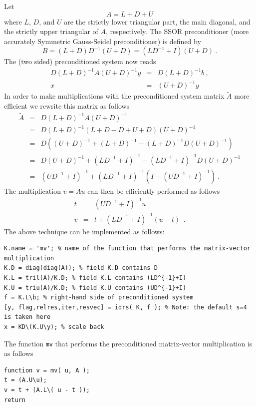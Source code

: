 \documentclass[prodmode,acmtoms]{acmsmall}
\begin{document}
Let 
\[
   A = L + D + U\nonumber
\]
where $L$, $D$, and $U$ are the strictly lower triangular part, the main diagonal, and the strictly upper triangular of $A$, respectively. 
The SSOR preconditioner (more accurately Symmetric Gauss-Seidel preconditioner) is defined by
\[
  B = (L+D) D^{-1} (U + D) = (L D^{-1} +I)(U + D) ~.
\]
The (two sided) preconditioned system now reads
\begin{eqnarray}\nonumber
  D (L+D)^{-1} A (U + D)^{-1} y &=&  D (L+D)^{-1}b ~,\\
  x &=& (U + D)^{-1} y
\end{eqnarray}
In order to make multiplications with the preconditioned system matrix $\tilde{A}$ more
efficient we rewrite this matrix as follows
\begin{eqnarray}\nonumber
  \tilde{A} &=& D (L+D)^{-1} A (U+D)^{-1}\\ \nonumber
            &=& D (L+D)^{-1} (L+D -D +U+D) (U+D)^{-1}\\  \nonumber
            &=& D ((U+D)^{-1} + (L+D)^{-1} - (L+D)^{-1}D(U+D)^{-1} )\\ \nonumber 
            &=& D(U+D)^{-1} + (LD^{-1}+I)^{-1} - (LD^{-1}+I)^{-1}D(U+D)^{-1}\\ \nonumber 
            &=& (UD^{-1}+I)^{-1} + (LD^{-1}+I)^{-1}(I - (UD^{-1}+I)^{-1} ) \nonumber ~.
\end{eqnarray}
The multiplication $v = \tilde{A}u$ can then be efficiently performed as follows
\begin{eqnarray}\nonumber
   t &=& (UD^{-1}+I)^{-1}u\\ \nonumber
   v &=& t + (LD^{-1}+I)^{-1}( u - t ) \nonumber ~~.
\end{eqnarray}
The above technique can be implemented as follows:
\begin{verbatim}
K.name = 'mv'; % name of the function that performs the matrix-vector multiplication
K.D = diag(diag(A)); % field K.D contains D
K.L = tril(A)/K.D; % field K.L contains (LD^{-1}+I)
K.U = triu(A)/K.D; % field K.U contains (UD^{-1}+I)
f = K.L\b; % right-hand side of preconditioned system
[y, flag,relres,iter,resvec] = idrs( K, f ); % Note: the default s=4 is taken here
x = KD\(K.U\y); % scale back
\end{verbatim}
The function {\tt mv} that performs the preconditioned matrix-vector  multiplication is as follows
\begin{verbatim}
function v = mv( u, A );
t = (A.U\u);
v = t + (A.L\( u - t ));
return
\end{verbatim}
   
\end{document}
